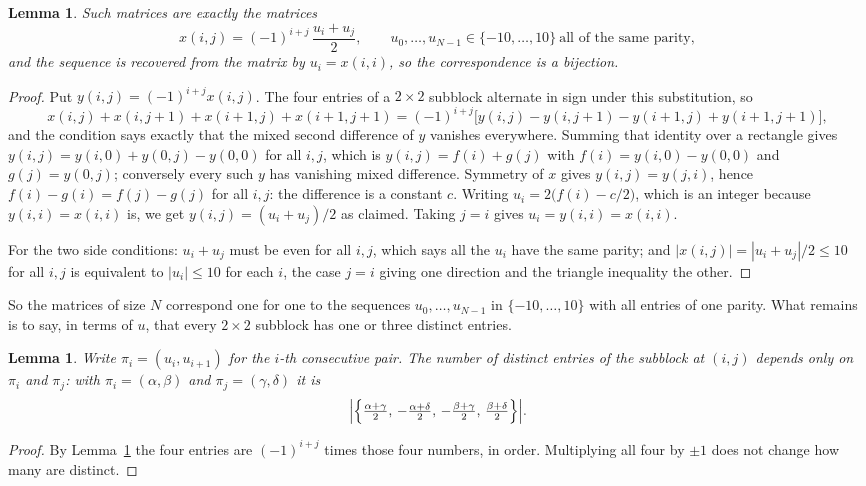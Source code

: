 \documentclass[11pt,a4paper]{article}
\theoremstyle{plain}
\newtheorem{lemma}[theorem]{Lemma}
\theoremstyle{definition}
\begin{document}
\begin{lemma}\label{lem:solve}
Such matrices are exactly the matrices
\[
x(i,j)=(-1)^{i+j}\,\frac{u_i+u_j}{2},
\qquad u_0,\dots,u_{N-1}\in\{-10,\dots,10\}\ \text{all of the same parity},
\]
and the sequence is recovered from the matrix by $u_i=x(i,i)$, so the correspondence is a
bijection.
\end{lemma}

\begin{proof}
Put $y(i,j)=(-1)^{i+j}x(i,j)$. The four entries of a $2\times2$ subblock alternate in sign
under this substitution, so
\[
x(i,j)+x(i,j{+}1)+x(i{+}1,j)+x(i{+}1,j{+}1)
=(-1)^{i+j}\bigl[y(i,j)-y(i,j{+}1)-y(i{+}1,j)+y(i{+}1,j{+}1)\bigr],
\]
and the condition says exactly that the mixed second difference of $y$ vanishes everywhere.
Summing that identity over a rectangle gives
$y(i,j)=y(i,0)+y(0,j)-y(0,0)$ for all $i,j$, which is $y(i,j)=f(i)+g(j)$ with
$f(i)=y(i,0)-y(0,0)$ and $g(j)=y(0,j)$; conversely every such $y$ has vanishing mixed
difference. Symmetry of $x$ gives $y(i,j)=y(j,i)$, hence $f(i)-g(i)=f(j)-g(j)$ for all $i,j$:
the difference is a constant $c$. Writing $u_i=2\bigl(f(i)-c/2\bigr)$, which is an integer
because $y(i,i)=x(i,i)$ is, we get $y(i,j)=(u_i+u_j)/2$ as claimed. Taking $j=i$ gives
$u_i=y(i,i)=x(i,i)$.

For the two side conditions: $u_i+u_j$ must be even for all $i,j$, which says all the $u_i$ have
the same parity; and $|x(i,j)|=|u_i+u_j|/2\le10$ for all $i,j$ is equivalent to $|u_i|\le10$
for each $i$, the case $j=i$ giving one direction and the triangle inequality the other.
\end{proof}

So the matrices of size $N$ correspond one for one to the sequences $u_0,\dots,u_{N-1}$ in
$\{-10,\dots,10\}$ with all entries of one parity. What remains is to say, in terms of $u$,
that every $2\times2$ subblock has one or three distinct entries.

\begin{lemma}\label{lem:block}
Write $\pi_i=(u_i,u_{i+1})$ for the $i$-th consecutive pair. The number of distinct entries of
the subblock at $(i,j)$ depends only on $\pi_i$ and $\pi_j$: with $\pi_i=(\alpha,\beta)$ and
$\pi_j=(\gamma,\delta)$ it is
\[
\Bigl|\Bigl\{\tfrac{\alpha+\gamma}{2},\,-\tfrac{\alpha+\delta}{2},\,
-\tfrac{\beta+\gamma}{2},\,\tfrac{\beta+\delta}{2}\Bigr\}\Bigr| .
\]
\end{lemma}

\begin{proof}
By Lemma~\ref{lem:solve} the four entries are $(-1)^{i+j}$ times those four numbers, in
order. Multiplying all four by $\pm1$ does not change how many are distinct.
\end{proof}
\end{document}
